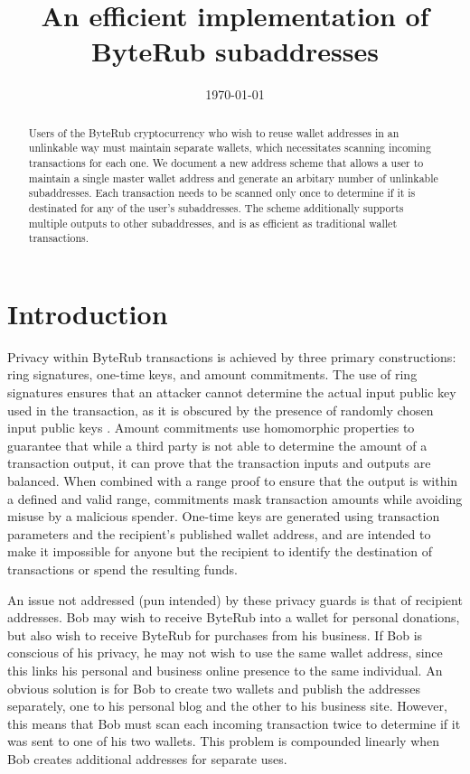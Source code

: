 \documentclass{mrl}
\title{An efficient implementation of ByteRub subaddresses}
\date{\today}
\begin{document}
\begin{abstract}
Users of the ByteRub cryptocurrency who wish to reuse wallet addresses in an unlinkable way must maintain separate wallets, which necessitates scanning incoming transactions for each one. We document a new address scheme that allows a user to maintain a single master wallet address and generate an arbitary number of unlinkable subaddresses. Each transaction needs to be scanned only once to determine if it is destinated for any of the user's subaddresses. The scheme additionally supports multiple outputs to other subaddresses, and is as efficient as traditional wallet transactions.
\end{abstract}

\section{Introduction}
Privacy within ByteRub transactions is achieved by three primary constructions: ring signatures, one-time keys, and amount commitments. The use of ring signatures ensures that an attacker cannot determine the actual input public key used in the transaction, as it is obscured by the presence of randomly chosen input public keys \cite{cryptonote}. Amount commitments use homomorphic properties to guarantee that while a third party is not able to determine the amount of a transaction output, it can prove that the transaction inputs and outputs are balanced. When combined with a range proof to ensure that the output is within a defined and valid range, commitments mask transaction amounts while avoiding misuse by a malicious spender. One-time keys are generated using transaction parameters and the recipient's published wallet address, and are intended to make it impossible for anyone but the recipient to identify the destination of transactions or spend the resulting funds.

An issue not addressed (pun intended) by these privacy guards is that of recipient addresses. Bob may wish to receive ByteRub into a wallet for personal donations, but also wish to receive ByteRub for purchases from his business. If Bob is conscious of his privacy, he may not wish to use the same wallet address, since this links his personal and business online presence to the same individual. An obvious solution is for Bob to create two wallets and publish the addresses separately, one to his personal blog and the other to his business site. However, this means that Bob must scan each incoming transaction twice to determine if it was sent to one of his two wallets. This problem is compounded linearly when Bob creates additional addresses for separate uses.
\end{document}
